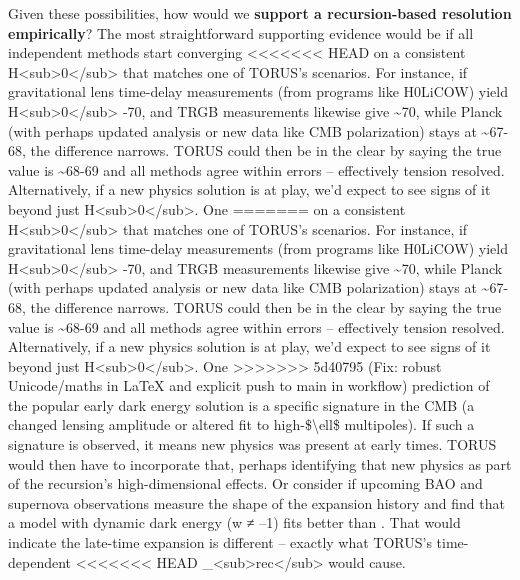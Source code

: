 \documentclass[]{article}
\begin{document}
Given these possibilities, how would we \textbf{support a
recursion-based resolution empirically}? The most straightforward
supporting evidence would be if all independent methods start converging
<<<<<<< HEAD
on a consistent H\textless sub\textgreater0\textless/sub\textgreater{}
that matches one of TORUS's scenarios. For instance, if gravitational
lens time-delay measurements (from programs like H0LiCOW) yield
H\textless sub\textgreater0\textless/sub\textgreater{} -70, and TRGB
measurements likewise give \textasciitilde70, while Planck (with perhaps
updated analysis or new data like CMB polarization) stays at
\textasciitilde67-68, the difference narrows. TORUS could then be in the
clear by saying the true value is \textasciitilde68-69 and all methods
agree within errors -- effectively tension resolved. Alternatively, if a
new physics solution is at play, we'd expect to see signs of it beyond
just H\textless sub\textgreater0\textless/sub\textgreater. One
=======
on a consistent
H\textless{}sub\textgreater{}0\textless{}/sub\textgreater{} that matches
one of TORUS's scenarios. For instance, if gravitational lens time-delay
measurements (from programs like H0LiCOW) yield
H\textless{}sub\textgreater{}0\textless{}/sub\textgreater{} -70, and
TRGB measurements likewise give \textasciitilde{}70, while Planck (with
perhaps updated analysis or new data like CMB polarization) stays at
\textasciitilde{}67-68, the difference narrows. TORUS could then be in
the clear by saying the true value is \textasciitilde{}68-69 and all
methods agree within errors -- effectively tension resolved.
Alternatively, if a new physics solution is at play, we'd expect to see
signs of it beyond just
H\textless{}sub\textgreater{}0\textless{}/sub\textgreater{}. One
>>>>>>> 5d40795 (Fix: robust Unicode/maths in LaTeX and explicit push to main in workflow)
prediction of the popular early dark energy solution is a specific
signature in the CMB (a changed lensing amplitude or altered fit to
high-\$\textbackslash{}ell\$ multipoles). If such a signature is
observed, it means new physics was present at early times. TORUS would
then have to incorporate that, perhaps identifying that new physics as
part of the recursion's high-dimensional effects. Or consider if
upcoming BAO and supernova observations measure the shape of the
expansion history and find that a model with dynamic dark energy (w ≠
--1) fits better than \LambdaCDM. That would indicate the late-time expansion
is different -- exactly what TORUS's time-dependent
<<<<<<< HEAD
\Lambda\_\textless sub\textgreater rec\textless/sub\textgreater{} would cause.
\end{document}
